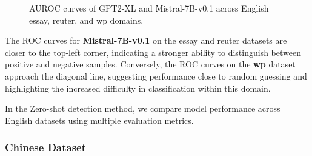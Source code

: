 \documentclass[lettersize,journal]{IEEEtran}
\begin{document}
\begin{figure}[H]
    \caption{AUROC curves of GPT2-XL and Mistral-7B-v0.1 across English essay, reuter, and wp domains.}
\end{figure}

The ROC curves for \textbf{Mistral-7B-v0.1} on the essay and reuter datasets are closer to the top-left corner, indicating a stronger ability to distinguish between positive and negative samples. Conversely, the ROC curves on the \textbf{wp} dataset approach the diagonal line, suggesting performance close to random guessing and highlighting the increased difficulty in classification within this domain.

In the Zero-shot detection method, we compare model performance across English datasets using multiple evaluation metrics.
\begin{table}[H]
 \centering
    \caption{gpt2-xl-Eng}
    \label{tab:my_label}
\setlength{\tabcolsep}{2pt}
\renewcommand{\arraystretch}{1.0}
\vspace{0.3cm}
\end{table}

\begin{table}[H]
 \centering
    \caption{Mistral-7B-v0.1-Eng}
    \label{tab:my_label}
\setlength{\tabcolsep}{2pt}
\renewcommand{\arraystretch}{1.0}
\vspace{0.3cm}
\end{table}



\subsubsection{Chinese Dataset}
\end{document}
